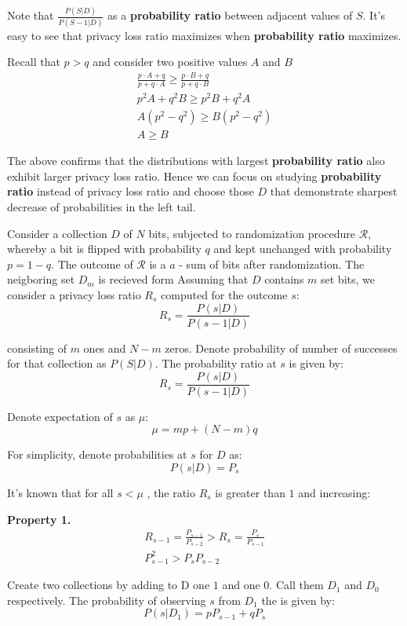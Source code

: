 \documentclass[11pt]{article}
\newcommand{\cR}{\mathcal{R}}
\begin{document}
Note that $\frac{P(S | D )}{P(S - 1| D )}$ as a \textbf{probability ratio} between adjacent values of $S$.  It's easy to see that privacy loss ratio maximizes when \textbf{probability ratio} maximizes. 

Recall that $p>q$ and consider two positive values $A$ and $B$ 
\begin{align*}
\frac{ p \cdot A + q } { p + q \cdot A }  \ge \frac{ p \cdot B + q } { p + q \cdot B } \\
p^2A + q^2B \ge p^2 B + q^2 A  \\
A (p^2 - q^2) \ge B (p^2 - q^2)  \\
A \ge B
\end{align*}

The above confirms that the distributions with largest \textbf{probability ratio} also exhibit larger privacy loss ratio. Hence we can focus on studying \textbf{probability ratio}  instead of privacy loss ratio and choose those $D$ that demonstrate sharpest decrease of probabilities in the left tail.




Consider a collection $D$ of $N$ bits, subjected to randomization procedure $\cR$, whereby a bit is flipped with probability $q$ and kept unchanged with probability $p=1-q$.  The outcome of $\cR$ is a $a$ - sum of bits after randomization. The neigboring set $D_m$ is recieved form Assuming that $D$ contains $m$ set bits, we consider a privacy loss ratio $R_s$ computed for the outcome $s$:
\[ R_s = \frac{P(s|D)}{P(s-1|D)} \] 


consisting of $m$ ones and $N-m$ zeros.  Denote probability of number of successes for that collection as $P(S|D)$.
The probability ratio at $s$  is given by:
\[ R_s = \frac{P(s|D)}{P(s-1|D)} \] 

Denote expectation of $s$ as $\mu$:
\[ \mu = mp + (N-m)q \]

For simplicity, denote probabilities at $s$ for $D$ as:
\[ P(s|D) = P_{s} \]

It's known that for all $s < \mu$ , the ratio $R_s$ is greater than $1$ and increasing:

\textbf{Property 1.}
\begin{align}
R_{s-1} = \frac{P_{s-1}}{P_{s-2}} > R_s  = \frac{P_{s}}{P_{s-1}} \\
P^2_{s-1} > P_sP_{s-2} 
\end{align}

Create two collections by adding to D one $1$ and one $0$.  Call them $D_1$ and $D_0$ respectively. The probability of observing $s$ from $D_1$ the is given by:
\[ P(s | D_1) = pP_{s-1} + qP_s \]
\end{document}
